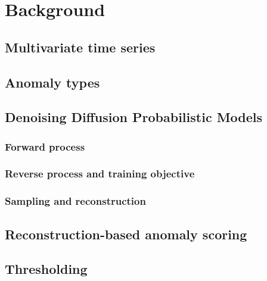 \chapter{Background}
\label{ch:background}

\section{Multivariate time series}

\section{Anomaly types}

\section{Denoising Diffusion Probabilistic Models}
\subsection{Forward process}

\subsection{Reverse process and training objective}

\subsection{Sampling and reconstruction}

\section{Reconstruction-based anomaly scoring}

\section{Thresholding}
